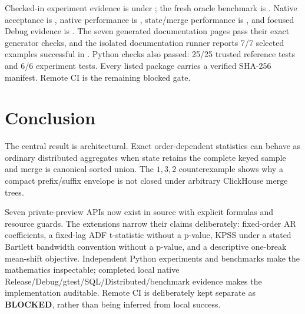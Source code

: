 \documentclass[11pt]{article}
\begin{document}
Checked-in experiment evidence is under ; the fresh oracle benchmark is . Native acceptance is , native performance is , state/merge performance is , and focused Debug evidence is . The seven generated documentation pages pass their exact generator checks, and the isolated documentation runner reports 7/7 selected examples successful in . Python checks also passed: 25/25 trusted reference tests and 6/6 experiment tests. Every listed package carries a verified SHA-256 manifest. Remote CI is the remaining blocked gate.

\section{Conclusion}

The central result is architectural. Exact order-dependent statistics can behave as ordinary distributed aggregates when state retains the complete keyed sample and merge is canonical sorted union. The $1,3,2$ counterexample shows why a compact prefix/suffix envelope is not closed under arbitrary ClickHouse merge trees.

Seven private-preview APIs now exist in source with explicit formulas and resource guards. The extensions narrow their claims deliberately: fixed-order AR coefficients, a fixed-lag ADF t-statistic without a p-value, KPSS under a stated Bartlett bandwidth convention without a p-value, and a descriptive one-break mean-shift objective. Independent Python experiments and benchmarks make the mathematics inspectable; completed local native Release/Debug/gtest/SQL/Distributed/benchmark evidence makes the implementation auditable. Remote CI is deliberately kept separate as \textbf{BLOCKED}, rather than being inferred from local success.



\end{document}
